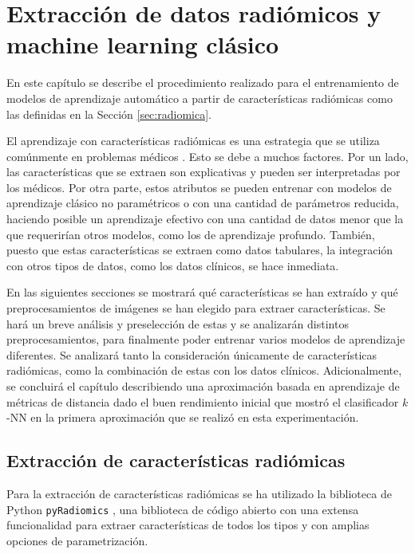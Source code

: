 
\chapter{Extracción de datos radiómicos y machine learning clásico} \label{chap:aa-radiomica}

En este capítulo se describe el procedimiento realizado para el entrenamiento de modelos de aprendizaje automático a partir de características radiómicas como las definidas en la Sección \ref{sec:radiomica}.

El aprendizaje con características radiómicas es una estrategia que se utiliza comúnmente en problemas médicos \parencite{shur2021radiomics,mukherjee2022radiomics}. Esto se debe a muchos factores. Por un lado, las características que se extraen son explicativas y pueden ser interpretadas por los médicos. Por otra parte, estos atributos se pueden entrenar con modelos de aprendizaje clásico no paramétricos o con una cantidad de parámetros reducida, haciendo posible un aprendizaje efectivo con una cantidad de datos menor que la que requerirían otros modelos, como los de aprendizaje profundo. También, puesto que estas características se extraen como datos tabulares, la integración con otros tipos de datos, como los datos clínicos, se hace inmediata.

En las siguientes secciones se mostrará qué características se han extraído y qué preprocesamientos de imágenes se han elegido para extraer características. Se hará un breve análisis y preselección de estas y se analizarán distintos preprocesamientos, para finalmente poder entrenar varios modelos de aprendizaje diferentes. Se analizará tanto la consideración únicamente de características radiómicas, como la combinación de estas con los datos clínicos. Adicionalmente, se concluirá el capítulo describiendo una aproximación basada en aprendizaje de métricas de distancia dado el buen rendimiento inicial que mostró el clasificador $k$-NN en la primera aproximación que se realizó en esta experimentación.

\section{Extracción de características radiómicas}

Para la extracción de características radiómicas se ha utilizado la biblioteca de Python \texttt{pyRadiomics} \parencite{van2017computational}, una biblioteca de código abierto con una extensa funcionalidad para extraer características de todos los tipos y con amplias opciones de parametrización. 

